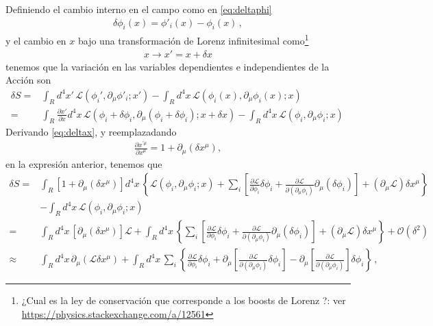 \begin{frame}
Definiendo el cambio interno en el campo como en \eqref{eq:deltaphi}
\begin{align}
  \delta\phi_i(x)=\phi'_i(x)-\phi_i(x)\,,
\end{align}
y el cambio en $x$ bajo una transformación de Lorenz infinitesimal como\footnote{¿Cual es la ley de conservación que corresponde a los boosts de Lorenz ?: ver \url{https://physics.stackexchange.com/a/12561}}
\begin{align}
\label{eq:deltax}
  x\to x'=x+\delta x
\end{align}
tenemos que la variación en las variables dependientes e independientes de la Acción son
\begin{align}
   \delta S=&\int_{R}d^4x'\,\mathcal{L} \left( \phi_{i}',\partial_{\mu}\phi'_i;x' \right)- \int_{R}d^4x\,\mathcal{L} \left( \phi_{i}(x),\partial_{\mu}\phi_i(x);x \right) \nonumber\\
     =&\int_{R}\frac{\partial x'}{\partial x}d^4x\,\mathcal{L} \left( \phi_{i}+\delta\phi_i,\partial_{\mu}(\phi_i+\delta\phi_i);x+\delta x \right)- \int_{R}d^4x\,\mathcal{L} \left( \phi_{i},\partial_{\mu}\phi_i;x \right)\,
\end{align}
Derivando \eqref{eq:deltax}, y reemplazadando
\begin{align}
  \frac{\partial x^{\prime \mu}}{\partial x^{\mu}}=1+\partial_{\mu} \left( \delta x^{\mu} \right),
\end{align}
en la expresión anterior, tenemos que
\begin{align}
     \delta S =&\int_{R} \left[ 1+\partial_{\mu} \left( \delta x^{\mu}  \right)\right]  d^4x\,\left\{ \mathcal{L}(\phi_i,\partial_{\mu}\phi_i;x)+\sum_i \left[ \frac{\partial\mathcal{L}}{\partial\phi_i}\delta\phi_{i} +\frac{\partial\mathcal{L}}{\partial(\partial_{\mu}\phi_i)}\partial_{\mu}(\delta\phi_{i}) \right]+\left( \partial_{\mu}\mathcal{L} \right)\delta x^{\mu} \right\}\nonumber\\
      &- \int_{R}d^4x\,\mathcal{L} \left( \phi_{i},\partial_{\mu}\phi_i;x \right) \nonumber\\
     =&\int_{R} d^4x\,\left[ \partial_{\mu} \left( \delta x^{\mu}  \right)\right] \mathcal{L} + \int_{R}d^4x\,\left\{\sum_i \left[ \frac{\partial\mathcal{L}}{\partial\phi_i}\delta\phi_{i} +\frac{\partial\mathcal{L}}{\partial(\partial_{\mu}\phi_i)}\partial_{\mu}(\delta\phi_{i}) \right]+\left( \partial_{\mu}\mathcal{L} \right)\delta x^{\mu} \right\}+\mathcal{O} \left( \delta^2 \right)\nonumber\\
     \approx&\int_{R} d^4x\,\partial_{\mu} \left(\mathcal{L} \delta x^{\mu}  \right)  + \int_{R}d^4x\,\sum_i \left\{ \frac{\partial\mathcal{L}}{\partial\phi_i}\delta\phi_{i} +\partial_{\mu} \left[ \frac{\partial\mathcal{L}}{\partial(\partial_{\mu}\phi_i)}\delta\phi_{i} \right]-\partial_{\mu} \left[ \frac{\partial\mathcal{L}}{\partial(\partial_{\mu}\phi_i)}\right]\delta\phi_{i}  \right\}\,,

\end{align}
\end{frame}
